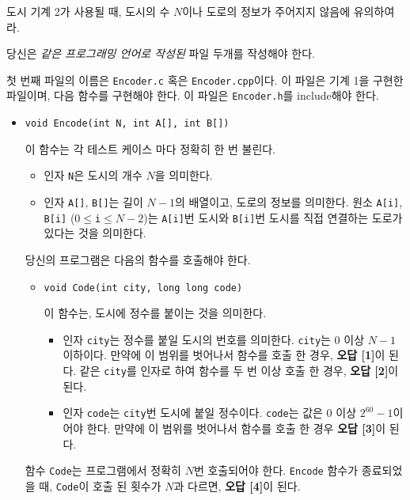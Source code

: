 \begin{problem}{도시}
	기계 2가 사용될 때, 도시의 수 $N$이나 도로의 정보가 주어지지 않음에 유의하여라.
	
	\Specification
	
	당신은 \textit{같은 프로그래밍 언어로 작성된} 파일 두개를 작성해야 한다.
	
	첫 번째 파일의 이름은 \texttt{Encoder.c} 혹은 \texttt{Encoder.cpp}이다. 이 파일은 기계 1을 구현한 파일이며, 다음 함수를 구현해야 한다. 이 파일은 \texttt{Encoder.h}를 include해야 한다.
	
	\begin{itemize}
		\item \texttt{void Encode(int N, int A[], int B[])}
		
		이 함수는 각 테스트 케이스 마다 정확히 한 번 불린다.
		\begin{itemize}
			\item 인자 \texttt{N}은 도시의 개수 $N$을 의미한다.
			\item 인자 \texttt{A[]}, \texttt{B[]}는 길이 $N-1$의 배열이고, 도로의 정보를 의미한다. 원소 \texttt{A[i]}, \texttt{B[i]} ($0 \le $\texttt{i}$\le N-2$)는 \texttt{A[i]}번 도시와 \texttt{B[i]}번 도시를 직접 연결하는 도로가 있다는 것을 의미한다.
		\end{itemize}
		
		당신의 프로그램은 다음의 함수를 호출해야 한다.
		\begin{itemize}
			\item \texttt{void Code(int city, long long code)}
			
			이 함수는, 도시에 정수를 붙이는 것을 의미한다.
			
			\begin{itemize}
				\item 인자 \texttt{city}는 정수를 붙일 도시의 번호를 의미한다. \texttt{city}는 0 이상 $N-1$ 이하이다. 만약에 이 범위를 벗어나서 함수를 호출 한 경우, \textbf{오답 [1]}이 된다. 같은 \texttt{city}를 인자로 하여 함수를 두 번 이상 호출 한 경우, \textbf{오답 [2]}이 된다.
				\item 인자 \texttt{code}는 \texttt{city}번 도시에 붙일 정수이다. \texttt{code}는 값은 0 이상 $2^{60}-1$이어야 한다. 만약에 이 범위를 벗어나서 함수를 호출 한 경우 \textbf{오답 [3]}이 된다.
			\end{itemize}
			
		\end{itemize}
		
		함수 \texttt{Code}는 프로그램에서 정확히 $N$번 호출되어야 한다. \texttt{Encode} 함수가 종료되었을 때, \texttt{Code}이 호출 된 횟수가 $N$과 다르면, \textbf{오답 [4]}이 된다.
		

\end{itemize}
\end{problem}
